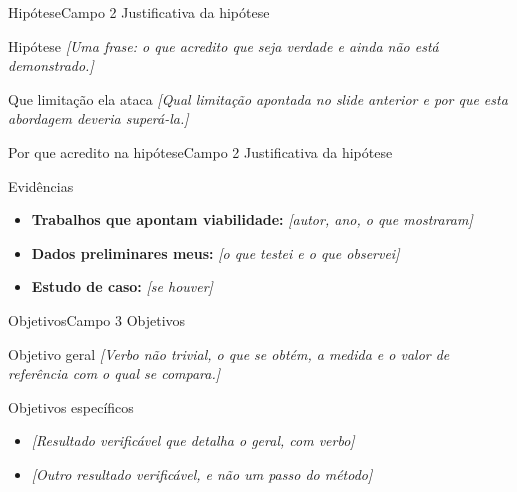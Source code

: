 \documentclass[aspectratio=169,11pt]{beamer}
\newcommand{\rotulo}[1]{\textcolor{maccent}{\small\bfseries #1}}
\newcommand{\preencher}[1]{\textcolor{mplace}{\textit{[#1]}}}
\begin{document}
\begin{frame}[t]{Hipótese}{Campo 2 \textperiodcentered{} Justificativa da hipótese}
  \begin{bloco}{Hipótese}
    \preencher{Uma frase: o que acredito que seja verdade e ainda não está demonstrado.}
  \end{bloco}

  \begin{bloco}{Que limitação ela ataca}
    \preencher{Qual limitação apontada no slide anterior e por que esta abordagem deveria superá-la.}
  \end{bloco}
\end{frame}

\begin{frame}[t]{Por que acredito na hipótese}{Campo 2 \textperiodcentered{} Justificativa da hipótese}
  \begin{bloco}{Evidências}
    \begin{itemize}\small
      \item \rotulo{Trabalhos que apontam viabilidade:} \preencher{autor, ano, o que mostraram}
      \item \rotulo{Dados preliminares meus:} \preencher{o que testei e o que observei}
      \item \rotulo{Estudo de caso:} \preencher{se houver}
    \end{itemize}
  \end{bloco}
\end{frame}

\begin{frame}[t]{Objetivos}{Campo 3 \textperiodcentered{} Objetivos}
  \begin{bloco}{Objetivo geral}
    \preencher{Verbo não trivial, o que se obtém, a medida e o valor de referência com o qual se compara.}
  \end{bloco}

  \begin{bloco}{Objetivos específicos}
    \begin{itemize}\small
      \item \preencher{Resultado verificável que detalha o geral, com verbo}
      \item \preencher{Outro resultado verificável, e não um passo do método}
    \end{itemize}
  \end{bloco}
\end{frame}
\end{document}
